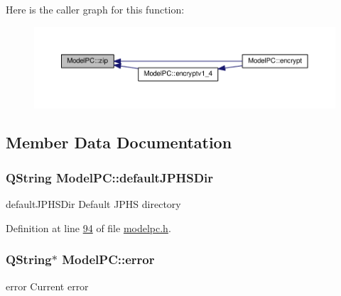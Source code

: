 Here is the caller graph for this function\+:
\nopagebreak
\begin{figure}[H]
\begin{center}
\leavevmode
\includegraphics[width=350pt]{class_model_p_c_afebbbfa4b07deba4f68fc6dfb50f353f_icgraph}
\end{center}
\end{figure}




\subsection{Member Data Documentation}
\subsubsection[{\texorpdfstring{default\+J\+P\+H\+S\+Dir}{defaultJPHSDir}}]{\setlength{\rightskip}{0pt plus 5cm}Q\+String Model\+P\+C\+::default\+J\+P\+H\+S\+Dir}\hypertarget{class_model_p_c_abd038306f14f22fb885a1697c96d6335}{}\label{class_model_p_c_abd038306f14f22fb885a1697c96d6335}


default\+J\+P\+H\+S\+Dir Default J\+P\+HS directory 



Definition at line \hyperlink{modelpc_8h_source_l00094}{94} of file \hyperlink{modelpc_8h_source}{modelpc.\+h}.

\subsubsection[{\texorpdfstring{error}{error}}]{\setlength{\rightskip}{0pt plus 5cm}Q\+String$\ast$ Model\+P\+C\+::error\hspace{0.3cm}{\ttfamily [protected]}}\hypertarget{class_model_p_c_a4e5a9c0ca1f06fe5bc478b6bf248c37c}{}\label{class_model_p_c_a4e5a9c0ca1f06fe5bc478b6bf248c37c}


error Current error 



